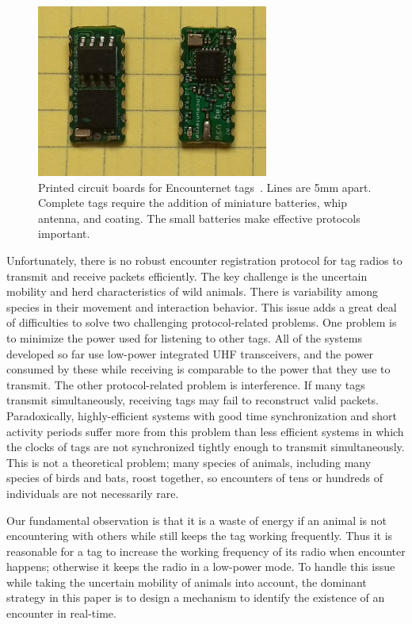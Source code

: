 \begin{figure}[!t]
    \centering
    \includegraphics[width=3in]{figures/tag}
    \caption{Printed circuit boards for Encounternet tags~\protect\cite{Menhill2012NovelTelemetry}.
    Lines are 5mm apart. Complete tags require the addition of miniature batteries, whip antenna, and
    coating. The small batteries make effective protocols important.}
    \label{tags}
\end{figure}

Unfortunately, there is no robust encounter registration protocol 
for tag radios to transmit and receive packets efficiently.
The key challenge is the uncertain mobility and herd characteristics of wild 
animals. There is variability among species in their movement and 
interaction behavior. This issue adds a great deal of difficulties to
solve two challenging protocol-related problems. 
One problem is to minimize the power used for listening to other tags. 
All of the systems developed so far use low-power integrated
UHF transceivers, and the power consumed by these while receiving is 
comparable to the power that they use to transmit. 
The other protocol-related problem is interference. 
If many tags transmit simultaneously, receiving tags may fail
to reconstruct valid packets. Paradoxically, highly-efficient 
systems with good time synchronization and short activity
periods suffer more from this problem than less efficient systems 
in which the clocks of tags are not synchronized tightly
enough to transmit simultaneously. This is not a theoretical problem; 
many species of animals, including many species of
birds and bats, roost together, so encounters of tens or hundreds 
of individuals are not necessarily rare.

Our fundamental observation is that it is a waste of 
energy if an animal is not encountering with others
while still keeps the tag working frequently.
Thus it is reasonable for a tag to
increase the working frequency of its radio when 
encounter happens; otherwise it keeps
the radio in a low-power mode. 
To handle this issue while taking the uncertain mobility of animals into account, 
the dominant strategy in this paper is to design a mechanism
to identify the existence of an encounter in real-time. 

